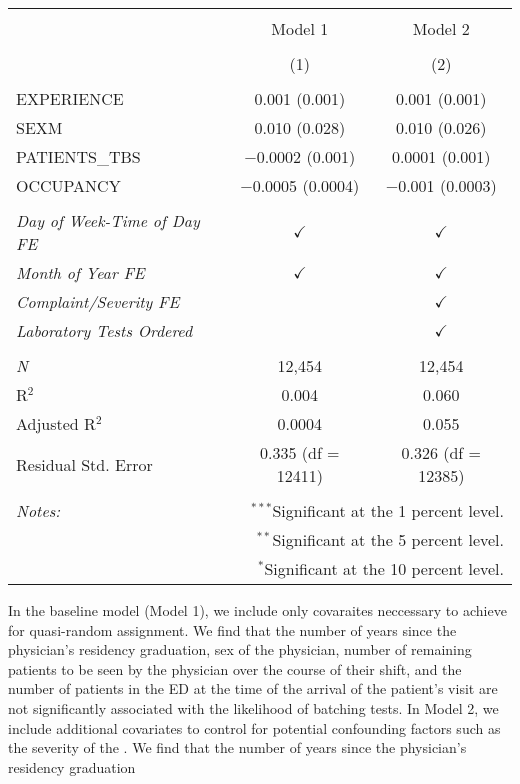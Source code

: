 \documentclass[,mnsc,nonblindrev]{informs}
\begin{document}
\begin{table}[!htbp] \centering 
  \caption{} 
  \label{} 
\begin{tabular}{@{\extracolsep{5pt}}lcc} 
\\[-1.8ex]\hline 
\hline \\[-1.8ex] 
 & Model 1 & Model 2 \\ 
\\[-1.8ex] & (1) & (2)\\ 
\hline \\[-1.8ex] 
 EXPERIENCE & 0.001 (0.001) & 0.001 (0.001) \\ 
  SEXM & 0.010 (0.028) & 0.010 (0.026) \\ 
  PATIENTS\_TBS & $-$0.0002 (0.001) & 0.0001 (0.001) \\ 
  OCCUPANCY & $-$0.0005 (0.0004) & $-$0.001 (0.0003) \\ 
 & &   \\
\textit{Day of Week-Time of Day FE} & $\checkmark$ & $\checkmark$  \\
\textit{Month of Year FE} & $\checkmark$ & $\checkmark$   \\
\textit{Complaint/Severity FE} & & $\checkmark$ \\
\textit{Laboratory Tests Ordered} & & $\checkmark$  \\
\hline \\[-1.8ex]
 \textit{N} & 12,454 & 12,454 \\ 
R$^{2}$ & 0.004 & 0.060 \\ 
Adjusted R$^{2}$ & 0.0004 & 0.055 \\ 
Residual Std. Error & 0.335 (df = 12411) & 0.326 (df = 12385) \\ 
\hline 
\hline \\[-1.8ex] 
\textit{Notes:} & \multicolumn{2}{r}{$^{***}$Significant at the 1 percent level.} \\ 
 & \multicolumn{2}{r}{$^{**}$Significant at the 5 percent level.} \\ 
 & \multicolumn{2}{r}{$^{*}$Significant at the 10 percent level.} \\ 
\end{tabular} 
\end{table}

In the baseline model (Model 1), we include only covaraites neccessary
to achieve for quasi-random assignment. We find that the number of years
since the physician's residency graduation, sex of the physician, number
of remaining patients to be seen by the physician over the course of
their shift, and the number of patients in the ED at the time of the
arrival of the patient's visit are not significantly associated with the
likelihood of batching tests. In Model 2, we include additional
covariates to control for potential confounding factors such as the
severity of the . We find that the number of years since the physician's
residency graduation
\end{document}
